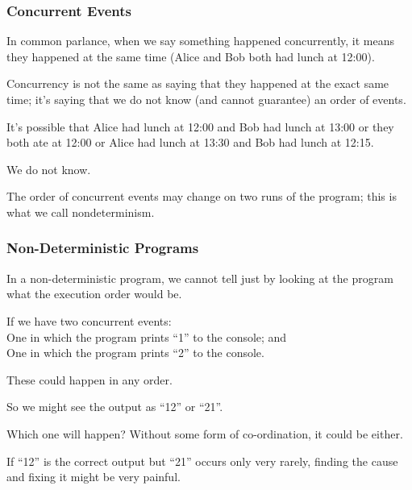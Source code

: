 \begin{frame}
	\frametitle{Concurrent Events}

	In common parlance, when we say something happened concurrently, it means they happened at the same time (Alice and Bob both had lunch at 12:00).

	Concurrency is not the same as saying that they happened at the exact same time; it's saying that we do not know (and cannot guarantee) an order of events.

	It's possible that Alice had lunch at 12:00 and Bob had lunch at 13:00 or they both ate at 12:00 or Alice had lunch at 13:30 and Bob had lunch at 12:15.

	We do not know.

	The order of concurrent events may change on two runs of the program; this is what we call \alert{nondeterminism}.

\end{frame}

\begin{frame}
	\frametitle{Non-Deterministic Programs}

	In a non-deterministic program, we cannot tell just by looking at the program what the execution order would be.

	If we have two concurrent events: \\
	\quad One in which the program prints ``1'' to the console; and\\
	\quad One in which the program prints ``2'' to the console.

	These could happen in any order.

	So we might see the output as ``12'' or ``21''.

	Which one will happen? Without some form of co-ordination, it could be either.

	If ``12'' is the correct output but ``21'' occurs only very rarely, finding the cause and fixing it might be very painful.


\end{frame}


